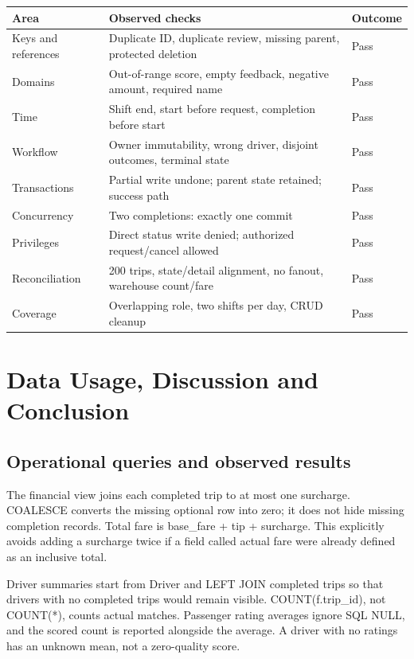 \documentclass[11pt,a4paper]{article}
\begin{document}
\par\begingroup\small\noindent
\begin{tabularx}{\linewidth}{p{2.5cm}Yp{1.5cm}}
\toprule
Area & Observed checks & Outcome\\\midrule
Keys and references & Duplicate ID, duplicate review, missing parent, protected deletion & Pass\\
Domains & Out-of-range score, empty feedback, negative amount, required name & Pass\\
Time & Shift end, start before request, completion before start & Pass\\
Workflow & Owner immutability, wrong driver, disjoint outcomes, terminal state & Pass\\
Transactions & Partial write undone; parent state retained; success path & Pass\\
Concurrency & Two completions: exactly one commit & Pass\\
Privileges & Direct status write denied; authorized request/cancel allowed & Pass\\
Reconciliation & 200 trips, state/detail alignment, no fanout, warehouse count/fare & Pass\\
Coverage & Overlapping role, two shifts per day, CRUD cleanup & Pass\\
\bottomrule
\end{tabularx}
\par\endgroup

\clearpage
\section{Data Usage, Discussion and Conclusion}
\subsection{Operational queries and observed results}
The financial view joins each completed trip to at most one surcharge. COALESCE converts the missing optional row into zero; it does not hide missing completion records. Total fare is base\_\allowbreak{}fare + tip + surcharge. This explicitly avoids adding a surcharge twice if a field called actual fare were already defined as an inclusive total.

Driver summaries start from Driver and LEFT JOIN completed trips so that drivers with no completed trips would remain visible. COUNT(f.trip\_\allowbreak{}id), not COUNT(*), counts actual matches. Passenger rating averages ignore SQL NULL, and the scored count is reported alongside the average. A driver with no ratings has an unknown mean, not a zero-quality score.
\end{document}
